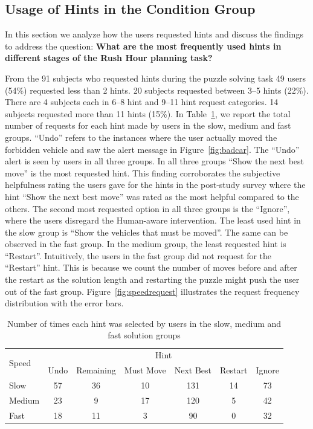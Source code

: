 \subsection{Usage of Hints in the Condition Group}
In this section we analyze how the users requested hints and discuss the findings to address the question: \textbf{What are the most frequently used hints in different stages of the Rush Hour planning task?}

From the 91 subjects who requested hints during the puzzle solving task 49 users (54\%) requested less than 2 hints. 20 subjects requested between 3--5 hints (22\%). 
There are 4 subjects each in 6--8 hint and 9--11 hint request categories. 
14 subjects requested more than 11 hints (15\%).
In Table~\ref{tab:speedsandrequests}, we report the total number of requests for each hint  made by users in the slow, medium and fast groups.
``Undo'' refers to the instances where the user actually moved the forbidden vehicle and saw the alert message in Figure~\ref{fig:badcar}.
The ``Undo'' alert is seen by users in all three groups.
In all three groups ``Show the next best move'' is the most requested hint. 
This finding corroborates the subjective helpfulness rating the users gave for the hints in the post-study survey where the hint ``Show the next best move'' was rated as the most helpful compared to the others.
The second most requested option in all three groups is the ``Ignore'', where the users disregard the Human-aware intervention.
The least used hint in the slow group is ``Show the vehicles that must be moved''.
The same can be observed in the fast group.
In the medium group, the least requested hint is ``Restart''.
Intuitively, the users in the fast group did not request for the ``Restart'' hint.
This is because we count the number of moves before and after the restart as the solution length and restarting the puzzle might push the user out of the fast group.
Figure~\ref{fig:speedrequest} illustrates the request frequency distribution with the error bars.


\begin{table}[tpb]
\begin{tabular}{|l|cccccc|}
\hline
\multirow{2}{*}{Speed} & \multicolumn{6}{c|}{Hint} \\ \cline{2-7} 
 & \multicolumn{1}{c|}{Undo} & \multicolumn{1}{c|}{Remaining} & \multicolumn{1}{c|}{Must Move} & \multicolumn{1}{c|}{Next Best} & \multicolumn{1}{c|}{Restart} & Ignore \\ \hline
Slow & 57 & 36 & 10 & 131 & 14 & 73 \\ \hline
Medium & 23 & 9 & 17 & 120 & 5 & 42 \\ \hline
Fast & 18 & 11 & 3 & 90 & 0 & 32 \\ \hline
\end{tabular}
\caption{Number of times each hint was selected by users in the slow, medium and fast solution groups}
\label{tab:speedsandrequests}
\end{table}

